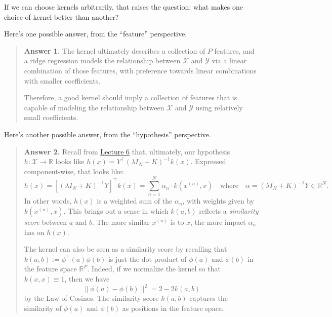 \begin{remark}
    If we can choose kernels arbitrarily,
    that raises the question:
    what makes one choice of kernel better than another?

    Here's one possible answer,
    from the ``feature'' perspective.

    \begin{quote}
        \textbf{Answer 1.}
        The kernel ultimately describes a collection of $P$ features,
        and a ridge regression models the relationship between
        $\mathcal{X}$ and $\mathcal{Y}$ via
        a linear combination of those features,
        with preference towards linear combinations
        with smaller coefficients.

        Therefore, a good kernel should imply a collection of features
        that is capable of modeling the relationship
        between $\mathcal{X}$ and $\mathcal{Y}$
        using relatively small coefficients.
    \end{quote}

    Here's another possible answer,
    from the ``hypothesis'' perspective.

    \begin{quote}
        \textbf{Answer 2.}
        Recall from
        \href{/6.790/lectures/6/#kernels-unlimited-features}{Lecture 6}
        that, ultimately, our hypothesis $h\colon \mathcal{X} \to \mathbb{R}$
        looks like
        $h(x) = Y^{\top}(\lambda I_N + K)^{-1}k(x)$.
        Expressed component-wise, that looks like:
        \[ h(x)
        = \left[(\lambda I_N + K)^{-1}Y\right]^{\top} k(x)
        = \sum_{n = 1}^N \alpha_n \cdot k(x^{(n)}, x)
        ~~~ \text{ where } ~~~
        \alpha = (\lambda I_N + K)^{-1}Y \in \mathbb{R}^N.  \]
        In other words, $h(x)$ is a weighted sum of the $\alpha_n$,
        with weights given by $k(x^{(n)}, x)$.
        This brings out a sense in which $k(a, b)$
        reflects a \emph{similarity score} between $a$ and $b$.
        The more similar $x^{(n)}$ is to $x$,
        the more impact $\alpha_n$ has on $h(x)$.

        The kernel can also be seen as a similarity score
        by recalling that $k(a, b) := \phi^{\top}(a) \phi(b)$
        is just the dot product of $\phi(a)$ and $\phi(b)$
        in the feature space $\mathbb{R}^P$.
        Indeed, if we normalize the kernel
        so that $k(x, x) \equiv 1$, then we have
        \[ \|\phi(a) - \phi(b)\|^2 = 2 - 2 k(a, b) \]
        by the Law of Cosines.
        The similarity score $k(a, b)$
        captures the similarity of $\phi(a)$ and $\phi(b)$
        as positions in the feature space.
    \end{quote}
\end{remark}

